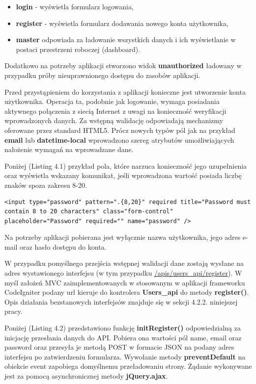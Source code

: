 \begin{itemize}
\item \textbf{login} - wyświetla formularz logowania,
\item \textbf{register} - wyświetla formularz dodawania nowego konta użytkownika,
\item \textbf{master} odpowiada za ładowanie wszystkich danych i ich wyświetlanie w postaci przestrzeni roboczej (dashboard).
\end{itemize}

Dodatkowo na potrzeby aplikacji stworzono widok \textbf{unauthorized} ładowany w przypadku próby nieuprawnionego dostępu do zasobów aplikacji.

Przed przystąpieniem do korzystania z aplikacji konieczne jest utworzenie konta użytkownika. Operacja ta, podobnie jak logowanie, wymaga posiadania aktywnego połączenia z siecią Internet z uwagi na konieczność weryfikacji wprowadzonych danych. Za wstępną walidację odpowiadają mechanizmy oferowane przez standard HTML5\cite{html5Valid}. Prócz nowych typów pól jak na przykład \textbf{email} lub \textbf{datetime-local} wprowadzono szereg atrybutów umożliwiających nałożenie wymagań na wprowadzane dane.

Poniżej (Listing 4.1) przykład pola, które narzuca konieczność jego uzupełnienia oraz wyświetla wskazany komunikat, jeśli wprowadzona wartość posiada liczbę znaków spoza zakresu 8-20.

\begin{lstlisting}[style=html5, caption=Przykład pola "hasło" w widoku rejestracji., label=amb, captionpos=b]
<input type="password" pattern=".{8,20}" required title="Password must contain 8 to 20 characters" class="form-control" placeholder="Password" required="" name="password" />
\end{lstlisting}

Na potrzeby aplikacji pobierana jest wyłącznie nazwa użytkownika, jego adres e-mail oraz hasło dostępu do konta.

W przypadku pomyślnego przejścia wstępnej walidacji dane zostają wysłane na adres wystawionego interfejsu (w tym przypadku \url{/apis/users_api/register}). W myśl założeń MVC zaimplementowanych w stosowanym w aplikacji frameworku CodeIgniter\cite{codeigniterUserGuide} podany url kieruje do kontrolera \textbf{Users\_api} do metody \textbf{register()}. Opis działania bezstanowych interfejsów znajduje się w sekcji 4.2.2. niniejszej pracy.

Poniżej (Listing 4.2) przedstawiono funkcję \textbf{initRegister()} odpowiedzialną za inicjację przesłania danych do API. Pobiera ona wartości pól name, email oraz password oraz przesyła je metodą POST w formacie JSON na podany adres interfejsu po zatwierdzeniu formularza. Wywołanie metody \textbf{preventDefault} na obiekcie event zapobiega domyślnemu przeładowaniu strony. Żądanie wykonywane jest za pomocą asynchronicznej metody \textbf{jQuery.ajax}.

